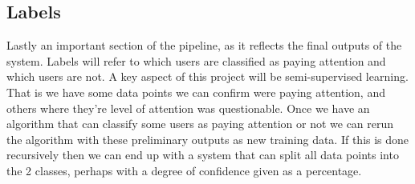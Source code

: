 \documentclass{article}
\begin{document}
\subsection{Labels}


Lastly an important section of the pipeline, as it reflects the final outputs of the system.
Labels will refer to which users are classified as paying attention and which users are not.
A key aspect of this project will be semi-supervised learning.
That is we have some data points we can confirm were paying attention, and others where they're level of attention was questionable.
Once we have an algorithm that can classify some users as paying attention or not we can rerun the algorithm with these preliminary outputs as new training data.
If this is done recursively then we can end up with a system that can split all data points into the 2 classes, perhaps with a degree of confidence given as a percentage.








\end{document}
